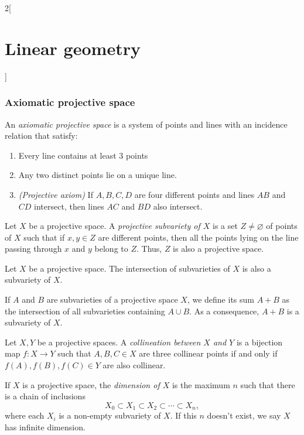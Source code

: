 \documentclass[../../../main.tex]{subfiles}
\begin{document}
\begin{multicols}{2}[\section{Linear geometry}]
    \subsubsection{Axiomatic projective space}
    \begin{definition}
        An \textit{axiomatic projective space} is a system of points and lines with an incidence relation that satisfy:
        \begin{enumerate}
            \item Every line contains at least 3 points
            \item Any two distinct points lie on a unique line.
            \item \textit{(Projective axiom)} If $A,B,C,D$ are four different points and lines $AB$ and $CD$ intersect, then lines $AC$ and $BD$ also intersect.
        \end{enumerate}
    \end{definition}
    \begin{definition}
        Let $X$ be a projective space. A \textit{projective subvariety of $X$} is a set $Z\ne\varnothing$ of points of $X$ such that if $x,y\in Z$ are different points, then all the points lying on the line passing through $x$ and $y$ belong to $Z$. Thus, $Z$ is also a projective space.
    \end{definition}
    \begin{prop}
        Let $X$ be a projective space. The intersection of subvarieties of $X$ is also a subvariety of $X$.
    \end{prop}
    \begin{prop}
        If $A$ and $B$ are subvarieties of a projective space $X$, we define its sum $A+B$ as the intersection of all subvarieties containing $A\cup B$. As a consequence, $A+B$ is a subvariety of $X$.
    \end{prop}
    \begin{definition}
        Let $X,Y$ be a projective spaces. A \textit{collineation between $X$ and $Y$} is a bijection map $f:X\rightarrow Y$ such that $A,B,C\in X$ are three collinear points if and only if $f(A),f(B),f(C)\in Y$ are also collinear.
    \end{definition}
    \begin{definition}
        If $X$ is a projective space, the \textit{dimension of $X$} is the maximum $n$ such that there is a chain of inclusions $$X_0\subset X_1\subset X_2 \subset\cdots\subset X_n,$$ where each $X_i$ is a non-empty subvariety of $X$. If this $n$ doesn't exist, we say $X$ has infinite dimension.

\end{definition}
\end{multicols}
\end{document}
